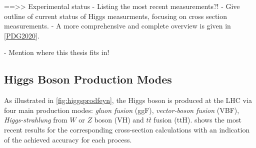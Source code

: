 ==>> Experimental status
- Listing the most recent measurements?!
- Give outline of current status of Higgs measurments, focusing on cross section measurements.
- A more comprehensive and complete overview is given in \cref{PDG2020}.

- Mention where this thesis fits in!










\subsection{Higgs Boson Production Modes}
\label{sec:higgsprod}
As illustrated in \cref{fig:higgsprodfeyn}, the Higgs boson is produced at the LHC via four main production modes: \emph{gluon fusion} (ggF), \emph{vector-boson fusion} (VBF), \emph{Higgs-strahlung} from $W$ or $Z$ boson (VH) and $t\bar{t}$ fusion (ttH).
 shows the most recent results for the corresponding cross-section calculations with an indication of the achieved accuracy for each process.

